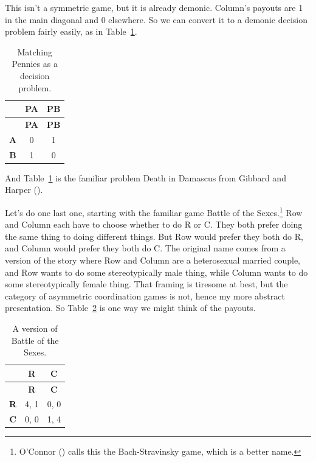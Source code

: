 \documentclass[
  12pt,
  letterpaper,
  DIV=11,
  numbers=noendperiod]{scrreprt}
\begin{document}
This isn't a symmetric game, but it is already demonic. Column's payouts
are 1 in the main diagonal and 0 elsewhere. So we can convert it to a
demonic decision problem fairly easily, as in
Table~\ref{tbl-death-in-damascus}.

\begin{longtable}[]{@{}ccc@{}}
\caption{Matching Pennies as a decision
problem.}\label{tbl-death-in-damascus}\tabularnewline
\toprule\noalign{}
& \textbf{PA} & \textbf{PB} \\
\midrule\noalign{}
\endfirsthead
\toprule\noalign{}
& \textbf{PA} & \textbf{PB} \\
\midrule\noalign{}
\endhead
\bottomrule\noalign{}
\endlastfoot
\textbf{A} & 0 & 1 \\
\textbf{B} & 1 & 0 \\
\end{longtable}

And Table~\ref{tbl-death-in-damascus} is the familiar problem Death in
Damascus from Gibbard and Harper
().

Let's do one last one, starting with the familiar game Battle of the
Sexes.\footnote{O'Connor () calls this
  the Bach-Stravinsky game, which is a better name.} Row and Column each
have to choose whether to do R or C. They both prefer doing the same
thing to doing different things. But Row would prefer they both do R,
and Column would prefer they both do C. The original name comes from a
version of the story where Row and Column are a heterosexual married
couple, and Row wants to do some stereotypically male thing, while
Column wants to do some stereotypically female thing. That framing is
tiresome at best, but the category of asymmetric coordination games is
not, hence my more abstract presentation. So
Table~\ref{tbl-bach-stravinsky} is one way we might think of the
payouts.

\begin{longtable}[]{@{}ccc@{}}
\caption{A version of Battle of the
Sexes.}\label{tbl-bach-stravinsky}\tabularnewline
\toprule\noalign{}
& \textbf{R} & \textbf{C} \\
\midrule\noalign{}
\endfirsthead
\toprule\noalign{}
& \textbf{R} & \textbf{C} \\
\midrule\noalign{}
\endhead
\bottomrule\noalign{}
\endlastfoot
\textbf{R} & 4, 1 & 0, 0 \\
\textbf{C} & 0, 0 & 1, 4 \\
\end{longtable}
\end{document}
